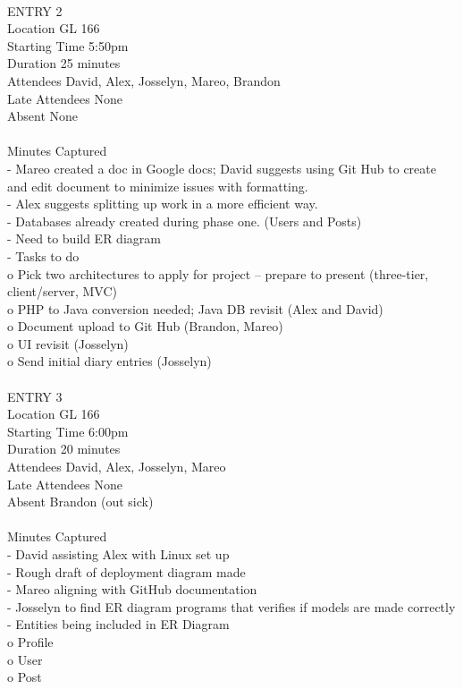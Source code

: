 \documentclass{report}
\begin{document}
\\
ENTRY 2\\	
Location		GL 166\\
Starting Time		5:50pm\\
Duration		25 minutes\\
Attendees		David, Alex, Josselyn, Mareo, Brandon\\
Late Attendees	None\\
Absent		None\\
\\
Minutes Captured\\
-	Mareo created a doc in Google docs; David suggests using Git Hub to create and edit document to minimize issues with formatting.\\
-	Alex suggests splitting up work in a more efficient way.\\
-	Databases already created during phase one. (Users and Posts)\\
-	Need to build ER diagram\\
-	Tasks to do\\
o	Pick two architectures to apply for project – prepare to present (three-tier, client/server, MVC)\\
o	PHP to Java conversion needed; Java DB revisit (Alex and David)\\
o	Document upload to Git Hub (Brandon, Mareo)\\
o	UI revisit (Josselyn)\\
o	Send initial diary entries (Josselyn)\\
\\
ENTRY 3\\	
Location		GL 166\\
Starting Time		6:00pm\\
Duration		20 minutes\\
Attendees		David, Alex, Josselyn, Mareo\\
Late Attendees	None\\
Absent		Brandon (out sick)\\
\\
Minutes Captured\\
-	David assisting Alex with Linux set up\\
-	Rough draft of deployment diagram made\\
-	Mareo aligning with GitHub documentation\\
-	Josselyn to find ER diagram programs that verifies if models are made correctly\\
-	Entities being included in ER Diagram\\
o	Profile\\
o	User\\
o	Post\\
\end{document}
